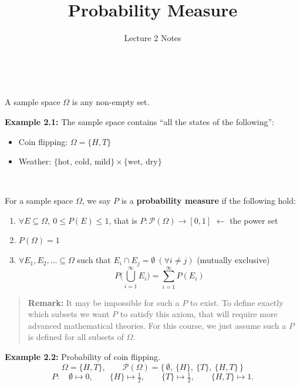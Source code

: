 \documentclass[11pt]{article}
\title{\textbf{Probability Measure}}
\author{Lecture 2 Notes}
\date{}
\newcommand{\deftitle}[1]{%
  \vspace{0.6em}
  \noindent\colorbox{defbg!70}{\parbox{\dimexpr\textwidth-2\fboxsep}{\textbf{\textcolor{white}{#1}}}}
  \vspace{0.4em}
}
\newenvironment{remark}{\begin{quote}\color{notepink}}{\end{quote}}
\begin{document}
\maketitle

\deftitle{Definition 2.1 --- Sample Space}

A sample space $\Omega$ is any non-empty set.

\vspace{0.5em}
\noindent \textbf{Example 2.1:} The sample space contains ``all the states of the following'':
\begin{itemize}
  \item Coin flipping: $\Omega = \{H, T\}$
  \item Weather: $\{\text{hot, cold, mild}\} \times \{\text{wet, dry}\}$
\end{itemize}

\deftitle{Definition 2.2 --- Probability Measure (STA 347 version)}

For a sample space $\Omega$, we say $P$ is a \textbf{probability measure} if the following hold:

\begin{enumerate}[label=(\roman*)]
  \item $\forall E \subseteq \Omega,\ 0 \le P(E) \le 1$, that is $P: \mathcal{P}(\Omega) \to [0,1]$ \hfill {\small\textcolor{noteblue}{$\leftarrow$ the power set}}
  \item $P(\Omega) = 1$
  \item $\forall E_1, E_2, \ldots \subseteq \Omega$ such that $E_i \cap E_j = \emptyset\ (\forall i \ne j)$ \hfill {\small\textcolor{noteyellow}{(mutually exclusive)}}
  \[
  P\Big(\bigcup_{i=1}^{\infty} E_i\Big) = \sum_{i=1}^{\infty} P(E_i)
  \]
\end{enumerate}

\begin{remark}
\textbf{Remark:} It may be impossible for such a $P$ to exist. To define exactly which subsets we want $P$ to satisfy this axiom, that will require more advanced mathematical theories. For this course, we just assume such a $P$ is defined for all subsets of $\Omega$.
\end{remark}

\noindent \textbf{Example 2.2:} Probability of coin flipping.
\[
\Omega = \{H, T\}, \qquad \mathcal{P}(\Omega) = \big\{\, \emptyset,\ \{H\},\ \{T\},\ \{H,T\} \,\big\}
\]
\[
P: \quad \emptyset \longmapsto 0, \qquad \{H\} \longmapsto \tfrac{1}{2}, \qquad \{T\} \longmapsto \tfrac{1}{2}, \qquad \{H,T\} \longmapsto 1.
\]
\end{document}
